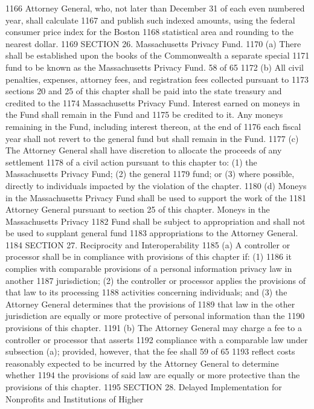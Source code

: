 1166 Attorney General, who, not later than December 31 of each even numbered year, shall calculate
1167 and publish such indexed amounts, using the federal consumer price index for the Boston
1168 statistical area and rounding to the nearest dollar.
1169 SECTION 26. Massachusetts Privacy Fund.
1170 (a) There shall be established upon the books of the Commonwealth a separate special
1171 fund to be known as the Massachusetts Privacy Fund.
58 of 65
1172 (b) All civil penalties, expenses, attorney fees, and registration fees collected pursuant to
1173 sections 20 and 25 of this chapter shall be paid into the state treasury and credited to the
1174 Massachusetts Privacy Fund. Interest earned on moneys in the Fund shall remain in the Fund and
1175 be credited to it. Any moneys remaining in the Fund, including interest thereon, at the end of
1176 each fiscal year shall not revert to the general fund but shall remain in the Fund.
1177 (c) The Attorney General shall have discretion to allocate the proceeds of any settlement
1178 of a civil action pursuant to this chapter to: (1) the Massachusetts Privacy Fund; (2) the general
1179 fund; or (3) where possible, directly to individuals impacted by the violation of the chapter.
1180 (d) Moneys in the Massachusetts Privacy Fund shall be used to support the work of the
1181 Attorney General pursuant to section 25 of this chapter. Moneys in the Massachusetts Privacy
1182 Fund shall be subject to appropriation and shall not be used to supplant general fund
1183 appropriations to the Attorney General.
1184 SECTION 27. Reciprocity and Interoperability
1185 (a) A controller or processor shall be in compliance with provisions of this chapter if: (1)
1186 it complies with comparable provisions of a personal information privacy law in another
1187 jurisdiction; (2) the controller or processor applies the provisions of that law to its processing
1188 activities concerning individuals; and (3) the Attorney General determines that the provisions of
1189 that law in the other jurisdiction are equally or more protective of personal information than the
1190 provisions of this chapter.
1191 (b) The Attorney General may charge a fee to a controller or processor that asserts
1192 compliance with a comparable law under subsection (a); provided, however, that the fee shall
59 of 65
1193 reflect costs reasonably expected to be incurred by the Attorney General to determine whether
1194 the provisions of said law are equally or more protective than the provisions of this chapter.
1195 SECTION 28. Delayed Implementation for Nonprofits and Institutions of Higher

